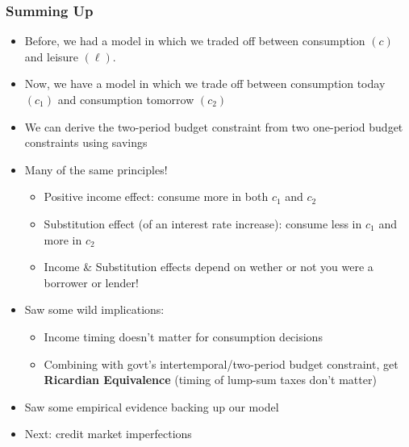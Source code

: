 \documentclass{beamer}
\begin{document}
\begin{frame}
\frametitle{Summing Up}
\begin{itemize}
\item Before, we had a model in which we traded off between consumption $(c)$ and leisure $(\ell)$.
\item Now, we have a model in which we trade off between consumption today $(c_1)$ and consumption tomorrow $(c_2)$
\item We can derive the two-period budget constraint from two one-period budget constraints using savings
\item Many of the same principles!
\begin{itemize}
\item Positive income effect: consume more in both $c_1$ and $c_2$
\item Substitution effect (of an interest rate increase): consume less in $c_1$ and more in $c_2$
\item Income \& Substitution effects depend on wether or not you were a borrower or lender!
\end{itemize}
\item Saw some wild implications:
\begin{itemize}
\item Income timing doesn't matter for consumption decisions
\item Combining with govt's intertemporal/two-period budget constraint, get \textbf{Ricardian Equivalence} (timing of lump-sum taxes don't matter)
\end{itemize}
\item Saw some empirical evidence backing up our model
\item Next:  credit market imperfections
\end{itemize}
\end{frame}
\end{document}
